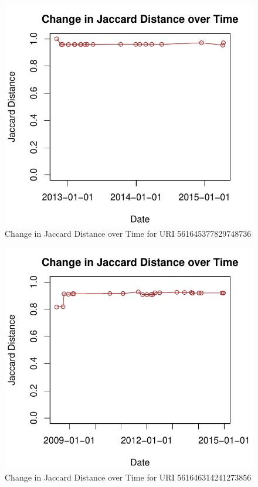 \documentclass[a4paper,12pt]{article}
\begin{document}
\begin{figure}[H]
    \centering
    \includegraphics{stats/q3/561645377829748736.pdf}
    \caption{Change in Jaccard Distance over Time for URI 561645377829748736}
\end{figure}

\begin{figure}[H]
    \centering
    \includegraphics{stats/q3/561646314241273856.pdf}
    \caption{Change in Jaccard Distance over Time for URI 561646314241273856}
\end{figure}
\end{document}
